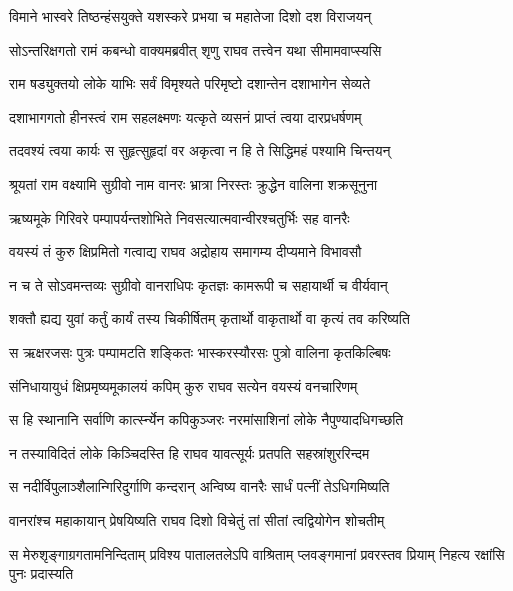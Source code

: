 \twolineshloka
{विमाने भास्वरे तिष्ठन्हंसयुक्ते यशस्करे}
{प्रभया च महातेजा दिशो दश विराजयन्} %

\twolineshloka
{सोऽन्तरिक्षगतो रामं कबन्धो वाक्यमब्रवीत्}
{शृणु राघव तत्त्वेन यथा सीमामवाप्स्यसि} %

\twolineshloka
{राम षड्युक्तयो लोके याभिः सर्वं विमृश्यते}
{परिमृष्टो दशान्तेन दशाभागेन सेव्यते} %

\twolineshloka
{दशाभागगतो हीनस्त्वं राम सहलक्ष्मणः}
{यत्कृते व्यसनं प्राप्तं त्वया दारप्रधर्षणम्} %

\twolineshloka
{तदवश्यं त्वया कार्यः स सुहृत्सुहृदां वर}
{अकृत्वा न हि ते सिद्धिमहं पश्यामि चिन्तयन्} %

\twolineshloka
{श्रूयतां राम वक्ष्यामि सुग्रीवो नाम वानरः}
{भ्रात्रा निरस्तः क्रुद्धेन वालिना शक्रसूनुना} %

\twolineshloka
{ऋष्यमूके गिरिवरे पम्पापर्यन्तशोभिते}
{निवसत्यात्मवान्वीरश्चतुर्भिः सह वानरैः} %

\twolineshloka
{वयस्यं तं कुरु क्षिप्रमितो गत्वाद्य राघव}
{अद्रोहाय समागम्य दीप्यमाने विभावसौ} %

\twolineshloka
{न च ते सोऽवमन्तव्यः सुग्रीवो वानराधिपः}
{कृतज्ञः कामरूपी च सहायार्थी च वीर्यवान्} %

\twolineshloka
{शक्तौ ह्यद्य युवां कर्तुं कार्यं तस्य चिकीर्षितम्}
{कृतार्थो वाकृतार्थो वा कृत्यं तव करिष्यति} %

\twolineshloka
{स ऋक्षरजसः पुत्रः पम्पामटति शङ्कितः}
{भास्करस्यौरसः पुत्रो वालिना कृतकिल्बिषः} %

\twolineshloka
{संनिधायायुधं क्षिप्रमृष्यमूकालयं कपिम्}
{कुरु राघव सत्येन वयस्यं वनचारिणम्} %

\twolineshloka
{स हि स्थानानि सर्वाणि कार्त्स्न्येन कपिकुञ्जरः}
{नरमांसाशिनां लोके नैपुण्यादधिगच्छति} %

\twolineshloka
{न तस्याविदितं लोके किञ्चिदस्ति हि राघव}
{यावत्सूर्यः प्रतपति सहस्रांशुररिन्दम} %

\twolineshloka
{स नदीर्विपुलाञ्शैलान्गिरिदुर्गाणि कन्दरान्}
{अन्विष्य वानरैः सार्धं पत्नीं तेऽधिगमिष्यति} %

\twolineshloka
{वानरांश्च महाकायान् प्रेषयिष्यति राघव}
{दिशो विचेतुं तां सीतां त्वद्वियोगेन शोचतीम्} %

\fourlineindentedshloka
{स मेरुशृङ्गाग्रगतामनिन्दिताम्}
{प्रविश्य पातालतलेऽपि वाश्रिताम्}
{प्लवङ्गमानां प्रवरस्तव प्रियाम्}
{निहत्य रक्षांसि पुनः प्रदास्यति} %


